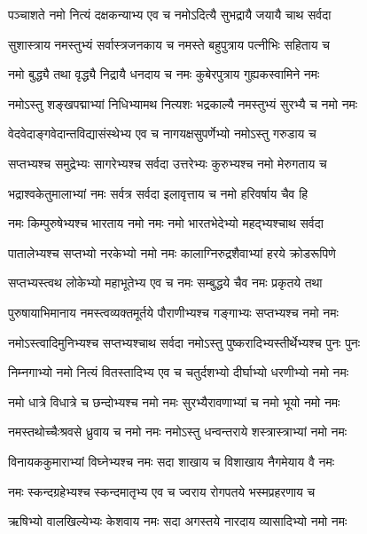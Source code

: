 \twolineshloka
{पञ्चाशते नमो नित्यं दक्षकन्याभ्य एव च}
{नमोऽदित्यै सुभद्रायै जयायै चाथ सर्वदा}

\twolineshloka
{सुशास्त्राय नमस्तुभ्यं सर्वास्त्रजनकाय च}
{नमस्ते बहुपुत्राय पत्नीभिः सहिताय च}

\twolineshloka
{नमो बुद्ध्यै तथा वृद्ध्यै निद्रायै धनदाय च}
{नमः कुबेरपुत्राय\footnotemark{} गुह्यकस्वामिने नमः}

\twolineshloka
{नमोऽस्तु शङ्खपद्माभ्यां निधिभ्यामथ नित्यशः}
{भद्रकाल्यै नमस्तुभ्यं सुरभ्यै च नमो नमः}

\twolineshloka
{वेदवेदाङ्गवेदान्तविद्यासंस्थेभ्य एव च}
{नागयक्षसुपर्णेभ्यो नमोऽस्तु गरुडाय च}

\twolineshloka
{सप्तभ्यश्च समुद्रेभ्यः सागरेभ्यश्च सर्वदा}
{उत्तरेभ्यः कुरुभ्यश्च नमो मेरुगताय\footnotemark{} च}

\twolineshloka
{भद्राश्वकेतुमालाभ्यां नमः सर्वत्र सर्वदा}
{इलावृत्ताय च नमो हरिवर्षाय चैव हि}

\twolineshloka
{नमः किम्पुरुषेभ्यश्च भारताय नमो नमः}
{नमो भारतभेदेभ्यो\footnotemark{} महद्भ्यश्चाथ सर्वदा}

\twolineshloka
{पातालेभ्यश्च सप्तभ्यो नरकेभ्यो नमो नमः}
{कालाग्निरुद्रशैवाभ्यां हरये क्रोडरूपिणे}

\twolineshloka
{सप्तभ्यस्त्वथ लोकेभ्यो महाभूतेभ्य एव च}
{नमः सम्बुद्धये चैव नमः प्रकृतये तथा}

\twolineshloka
{पुरुषायाभिमानाय नमस्त्वव्यक्तमूर्तये}
{पौराणीभ्यश्च गङ्गाभ्यः सप्तभ्यश्च नमो नमः}

\twolineshloka
{नमोऽस्त्वादिमुनिभ्यश्च सप्तभ्यश्चाथ सर्वदा}
{नमोऽस्तु पुष्करादिभ्यस्तीर्थेभ्यश्च पुनः पुनः}

\twolineshloka
{निम्नगाभ्यो नमो नित्यं वितस्तादिभ्य एव च}
{चतुर्दशभ्यो दीर्घाभ्यो धरणीभ्यो नमो नमः}

\twolineshloka
{नमो धात्रे विधात्रे च छन्दोभ्यश्च नमो नमः}
{सुरभ्यैरावणाभ्यां च नमो भूयो नमो नमः}

\twolineshloka
{नमस्तथोच्चैःश्रवसे ध्रुवाय च नमो नमः}
{नमोऽस्तु धन्वन्तराये शस्त्रास्त्राभ्यां नमो नमः}

\twolineshloka
{विनायककुमाराभ्यां विघ्नेभ्यश्च नमः सदा}
{शाखाय च विशाखाय नैगमेयाय वै नमः}

\twolineshloka
{नमः स्कन्दग्रहेभ्यश्च स्कन्दमातृभ्य एव च}
{ज्वराय रोगपतये भस्मप्रहरणाय च}

\twolineshloka
{ऋषिभ्यो वालखिल्येभ्यः केशवाय नमः सदा}
{अगस्तये नारदाय व्यासादिभ्यो नमो नमः}

